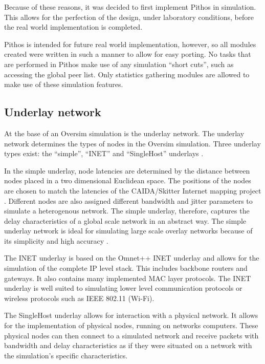 Because of these reasons, it was decided to first implement Pithos in simulation. This allows for the perfection of the design, under laboratory conditions, before the real world implementation is completed.

Pithos is intended for future real world implementation, however, so all modules created were written in such a manner to allow for easy porting. No tasks that are performed in Pithos make use of any simulation ``short cuts'', such as accessing the global peer list. Only statistics gathering modules are allowed to make use of these simulation features.

\subsection{Underlay network}
\label{oversim_underlay}

At the base of an Oversim simulation is the underlay network. The underlay network determines the types of nodes in the Oversim simulation. Three underlay types exist: the ``simple'', ``INET'' and ``SingleHost'' underlays \cite{oversim_applications}.

In the simple underlay, node latencies are determined by the distance between nodes placed in a two dimensional Euclidean space. The positions of the nodes are chosen to match the latencies of the CAIDA/Skitter Internet mapping project \cite{caida_skitter}. Different nodes are also assigned different bandwidth and jitter parameters to simulate a heterogenous network. The simple underlay, therefore, captures the delay characteristics of a global scale network in an abstract way. The simple underlay network is ideal for simulating large scale overlay networks because of its simplicity and high accuracy \cite{oversim_applications}.

The INET underlay is based on the Omnet++ INET underlay and allows for the simulation of the complete IP level stack. This includes backbone routers and gateways. It also contains many implemented MAC layer protocols. The INET underlay is well suited to simulating lower level communication protocols or wireless protocols such as IEEE 802.11 (Wi-Fi).

The SingleHost underlay allows for interaction with a physical network. It allows for the implementation of physical nodes, running on networks computers. These physical nodes can then connect to a simulated network and receive packets with bandwidth and delay characteristics as if they were situated on a network with the simulation's specific characteristics.

